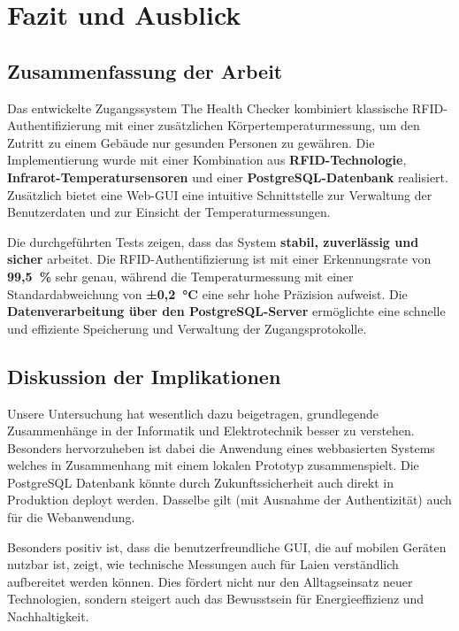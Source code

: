 \section{Fazit und Ausblick}
\label{sec:fazit_und_ausblick}

\subsection{Zusammenfassung der Arbeit}

Das entwickelte Zugangssystem The Health Checker kombiniert klassische RFID-Authentifizierung mit einer zusätzlichen Körpertemperaturmessung, um den Zutritt zu einem Gebäude nur gesunden Personen zu gewähren. Die Implementierung wurde mit einer Kombination aus \textbf{RFID-Technologie}, \textbf{Infrarot-Temperatursensoren} und einer \textbf{PostgreSQL-Datenbank} realisiert. Zusätzlich bietet eine Web-GUI eine intuitive Schnittstelle zur Verwaltung der Benutzerdaten und zur Einsicht der Temperaturmessungen.

\vspace{1em}
\noindent Die durchgeführten Tests zeigen, dass das System \textbf{stabil, zuverlässig und sicher} arbeitet. Die RFID-Authentifizierung ist mit einer Erkennungsrate von \textbf{99,5~\%} sehr genau, während die Temperaturmessung mit einer Standardabweichung von \textbf{±0,2~°C} eine sehr hohe Präzision aufweist. Die \textbf{Datenverarbeitung über den PostgreSQL-\-Server} ermöglichte eine schnelle und effiziente Speicherung und Verwaltung der Zugangsprotokolle.

\subsection{Diskussion der Implikationen}

Unsere Untersuchung hat wesentlich dazu beigetragen, grundlegende Zusammenhänge in der Informatik und Elektrotechnik besser zu verstehen. Besonders hervorzuheben ist dabei die Anwendung eines webbasierten Systems welches in Zusammenhang mit einem lokalen Prototyp zusammenspielt. Die PostgreSQL Datenbank könnte durch Zukunftssicherheit auch direkt in Produktion deployt werden. Dasselbe gilt (mit Ausnahme der Authentizität) auch für die Webanwendung.

\vspace{1em}
\noindent Besonders positiv ist, dass die benutzerfreundliche GUI, die auf mobilen Geräten nutzbar ist, zeigt, wie technische Messungen auch für Laien verständlich aufbereitet werden können. Dies fördert nicht nur den Alltagseinsatz neuer Technologien, sondern steigert auch das Bewusstsein für Energieeffizienz und Nachhaltigkeit.


